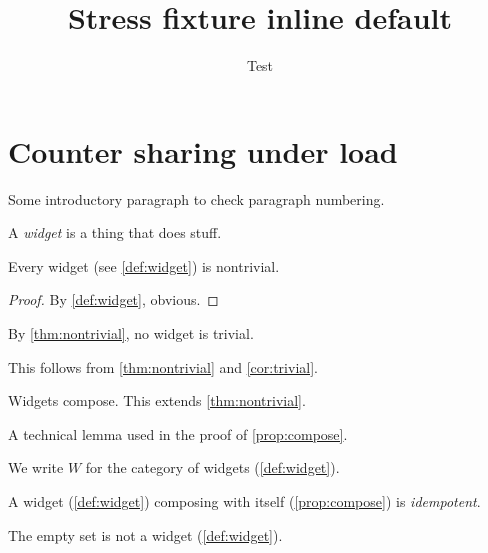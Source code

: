 \documentclass{article}
\title{Stress fixture inline default}
\author{Test}
\date{}
\begin{document}
\START
\maketitle

\section{Counter sharing under load}

Some introductory paragraph to check paragraph numbering.

\begin{definition}\label{def:widget}
A \emph{widget} is a thing that does stuff.
\end{definition}

\begin{theorem}\label{thm:nontrivial}
Every widget (see \cref{def:widget}) is nontrivial.
\end{theorem}

\begin{proof}
By \cref{def:widget}, obvious.
\end{proof}

\begin{corollary}\label{cor:trivial}
By \cref{thm:nontrivial}, no widget is trivial.
\end{corollary}

\begin{remark}\label{rem:note}
This follows from \cref{thm:nontrivial} and \cref{cor:trivial}.
\end{remark}

\begin{proposition}\label{prop:compose}
Widgets compose. This extends \cref{thm:nontrivial}.
\end{proposition}

\begin{lemma}\label{lem:technical}
A technical lemma used in the proof of \cref{prop:compose}.
\end{lemma}

\begin{notation}\label{not:W}
We write $W$ for the category of widgets (\cref{def:widget}).
\end{notation}

\begin{terminology}\label{term:idempotent}
A widget (\cref{def:widget}) composing with itself (\cref{prop:compose}) is \emph{idempotent}.
\end{terminology}

\begin{example}\label{ex:empty}
The empty set is not a widget (\cref{def:widget}).
\end{example}
\end{document}
